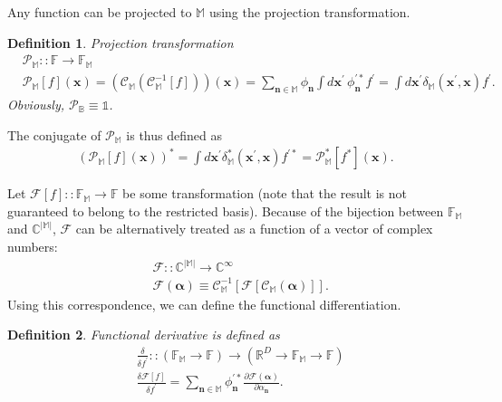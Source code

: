 \documentclass[12pt,aip,jmp,amssymb,amsmath]{revtex4-1}
\newtheorem{definition}{Definition}
\begin{document}
Any function can be projected to $\mathbb{M}$ using the projection transformation.

\begin{definition}
\label{def:func-calculus:projector}
    Projection transformation
    \begin{eqnarray*}
        & \mathcal{P}_{\mathbb{M}} ::
        \mathbb{F} \rightarrow \mathbb{F}_{\mathbb{M}} \\
        & \mathcal{P}_{\mathbb{M}}[f](\boldsymbol{x})
        = (\mathcal{C}_{\mathbb{M}}(\mathcal{C}_{\mathbb{M}}^{-1}[f])) (\boldsymbol{x})
        = \sum_{\boldsymbol{n} \in \mathbb{M}} \phi_{\boldsymbol{n}} \int
            d\boldsymbol{x}^\prime\, \phi_{\boldsymbol{n}}^{\prime*} f^\prime
        = \int d\boldsymbol{x}^\prime \delta_{\mathbb{M}}(\boldsymbol{x}^\prime, \boldsymbol{x}) f^\prime.
    \end{eqnarray*}
    Obviously, $\mathcal{P}_{\mathbb{B}} \equiv \mathds{1}$.
\end{definition}

The conjugate of $\mathcal{P}_{\mathbb{M}}$ is thus defined as
\begin{eqnarray}
    (\mathcal{P}_{\mathbb{M}}[f](\boldsymbol{x}))^*
    = \int d\boldsymbol{x}^\prime \delta_{\mathbb{M}}^*(\boldsymbol{x}^\prime, \boldsymbol{x}) f^{\prime*}
    = \mathcal{P}_{\mathbb{M}}^* [f^*](\boldsymbol{x}).
\end{eqnarray}

Let $\mathcal{F}[f] :: \mathbb{F}_{\mathbb{M}} \rightarrow \mathbb{F}$ be some transformation (note that the result is not guaranteed to belong to the restricted basis).
Because of the bijection between $\mathbb{F}_{\mathbb{M}}$ and $\mathbb{C}^{|\mathbb{M}|}$, $\mathcal{F}$ can be alternatively treated as a function of a vector of complex numbers:
\begin{eqnarray}
    & \mathcal{F} :: \mathbb{C}^{|\mathbb{M}|} \rightarrow \mathbb{C}^\infty \\
    & \mathcal{F}(\boldsymbol{\alpha}) \equiv \mathcal{C}_{\mathbb{M}}^{-1}[\mathcal{F}[\mathcal{C}_{\mathbb{M}}(\boldsymbol{\alpha})]].
\end{eqnarray}
Using this correspondence, we can define the functional differentiation.

\begin{definition}
\label{def:func-calculus:func-diff}
    Functional derivative is defined as
    \begin{eqnarray*}
        & \frac{\delta}{\delta f^\prime} ::
        \left(
            \mathbb{F}_{\mathbb{M}} \rightarrow \mathbb{F}
        \right)
        \rightarrow
        \left(
            \mathbb{R}^D \rightarrow \mathbb{F}_{\mathbb{M}} \rightarrow \mathbb{F}
        \right) \\
        & \frac{\delta \mathcal{F}[f]}{\delta f^\prime}
        = \sum_{\boldsymbol{n} \in \mathbb{M}} \phi_{\boldsymbol{n}}^{\prime*}
            \frac{\partial \mathcal{F}(\boldsymbol{\alpha})}{\partial \alpha_{\boldsymbol{n}}}.
    \end{eqnarray*}
\end{definition}
\end{document}
